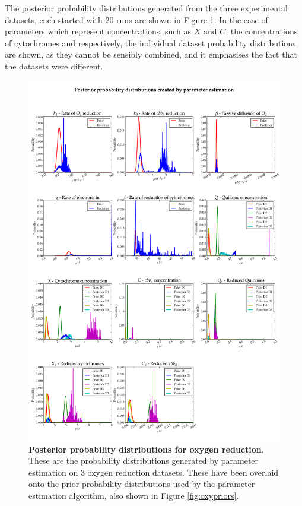 The posterior probability distributions generated from the three experimental datasets, each started with 20 runs are shown in Figure \ref{fig:oxyposteriors}. In the case of parameters which represent concentrations, such as $X$ and $C$, the concentrations of cytochromes and \cbbthree{} respectively, the individual dataset probability distributions are shown, as they cannot be sensibly combined, and it emphasises the fact that the datasets were different.

\begin{figure}[p]
 \centering
 \includegraphics[width=15cm, trim=0cm 0cm 0cm 0cm]{./05-oxygenreduction/data/posteriors1.pdf}
 \caption[Posterior probability distributions for oxygen reduction]{{\bf Posterior probability distributions for oxygen reduction}. These are the probability distributions generated by parameter estimation on 3 oxygen reduction datasets. These have been overlaid onto the prior probability distributions used by the parameter estimation algorithm, also shown in Figure \ref{fig:oxypriors}.
 \label{fig:oxyposteriors}}
\end{figure}
\afterpage{\clearpage}


